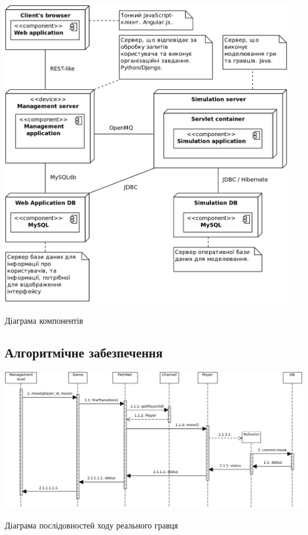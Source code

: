 \begin{stdfigure}
    \includegraphics[width=5in]{images/uml/component_diagram.png}
    \caption{Діаграма компонентів}
    \label{fig:uml_components}
\end{stdfigure}   



\subsection{Алгоритмічне забезпечення}


\begin{stdfigure}
    \includegraphics[width=7in]{images/uml/live_move.png}
    \caption{Діаграма послідовностей ходу реального гравця}
    \label{fig:uml_live_move}
\end{stdfigure}   

